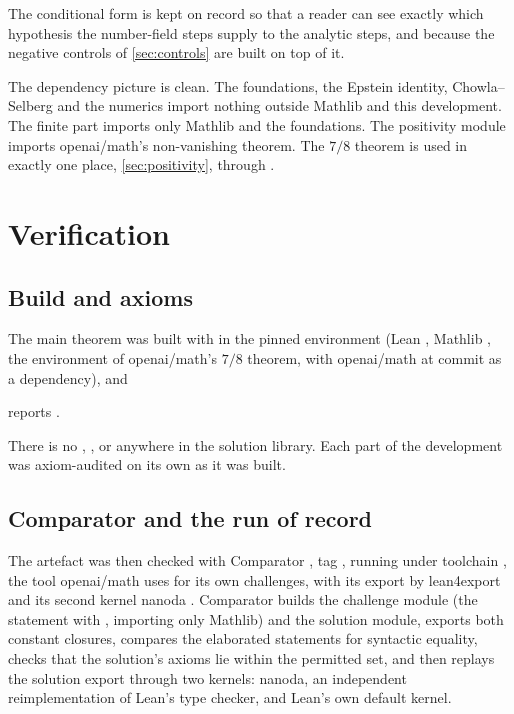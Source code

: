 \documentclass[11pt]{article}
\theoremstyle{definition}
\begin{document}
The conditional form is kept on record so that a reader can see exactly which hypothesis the number-field steps supply to the analytic steps, and because the negative controls of \cref{sec:controls} are built on top of it.

The dependency picture is clean. The foundations, the Epstein identity, Chowla--Selberg and the numerics import nothing outside Mathlib and this development. The finite part imports only Mathlib and the foundations. The positivity module imports openai/math's non-vanishing theorem. The $7/8$ theorem is used in exactly one place, \cref{sec:positivity}, through .

\section{Verification}\label{sec:verification}

\subsection{Build and axioms}

The main theorem was built with  in the pinned environment (Lean , Mathlib , the environment of openai/math's $7/8$ theorem, with openai/math at commit  as a dependency), and
\begin{center}
 \quad reports \quad {}.
\end{center}
There is no , ,  or  anywhere in the solution library. Each part of the development was axiom-audited on its own as it was built.

\subsection{Comparator and the run of record}\label{sec:comparator}

The artefact was then checked with Comparator \cite{Comparator}, tag , running under toolchain , the tool openai/math uses for its own challenges, with its export by lean4export and its second kernel nanoda \cite{nanoda}. Comparator builds the challenge module (the statement with , importing only Mathlib) and the solution module, exports both constant closures, compares the elaborated statements for syntactic equality, checks that the solution's axioms lie within the permitted set, and then replays the solution export through two kernels: nanoda, an independent reimplementation of Lean's type checker, and Lean's own default kernel.
\end{document}
